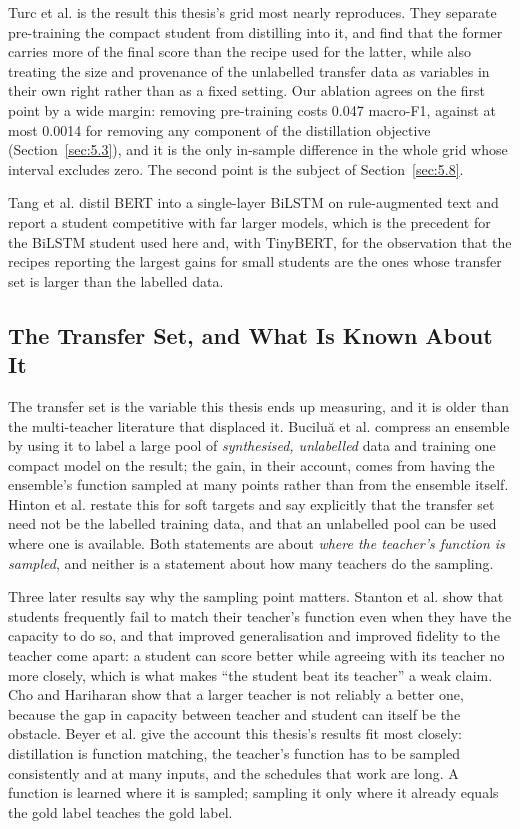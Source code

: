 Turc et al. \cite{turc2019wellread} is the result this thesis's grid most nearly reproduces. They
separate pre-training the compact student from distilling into it, and find that the former carries more
of the final score than the recipe used for the latter, while also treating the size and provenance of
the unlabelled transfer data as variables in their own right rather than as a fixed setting. Our
ablation agrees on the first point by a wide margin: removing pre-training costs 0.047 macro-F1, against
at most 0.0014 for removing any component of the distillation objective (Section~\ref{sec:5.3}), and it
is the only in-sample difference in the whole grid whose interval excludes zero. The second point is the
subject of Section~\ref{sec:5.8}.

Tang et al. \cite{tang2019distilling} distil BERT into a single-layer BiLSTM on rule-augmented text and
report a student competitive with far larger models, which is the precedent for the BiLSTM student used
here and, with TinyBERT, for the observation that the recipes reporting the largest gains for small
students are the ones whose transfer set is larger than the labelled data.


\subsection{The Transfer Set, and What Is Known About It}
\label{sec:2.transfer}
The transfer set is the variable this thesis ends up measuring, and it is older than the multi-teacher
literature that displaced it. Buciluă et al. \cite{bucilua2006model} compress an ensemble by using it to
label a large pool of \emph{synthesised, unlabelled} data and training one compact model on the result;
the gain, in their account, comes from having the ensemble's function sampled at many points rather than
from the ensemble itself. Hinton et al. \cite{hinton2015distilling} restate this for soft targets and
say explicitly that the transfer set need not be the labelled training data, and that an unlabelled pool
can be used where one is available. Both statements are about \emph{where the teacher's function is
sampled}, and neither is a statement about how many teachers do the sampling.

Three later results say why the sampling point matters. Stanton et al. \cite{stanton2021does} show that
students frequently fail to match their teacher's function even when they have the capacity to do so,
and that improved generalisation and improved fidelity to the teacher come apart: a student can score
better while agreeing with its teacher no more closely, which is what makes ``the student beat its
teacher'' a weak claim. Cho and Hariharan \cite{cho2019efficacy} show that a larger teacher is not
reliably a better one, because the gap in capacity between teacher and student can itself be the
obstacle. Beyer et al. \cite{beyer2022knowledge} give the account this thesis's results fit most
closely: distillation is function matching, the teacher's function has to be sampled consistently and at
many inputs, and the schedules that work are long. A function is learned where it is sampled; sampling
it only where it already equals the gold label teaches the gold label.

